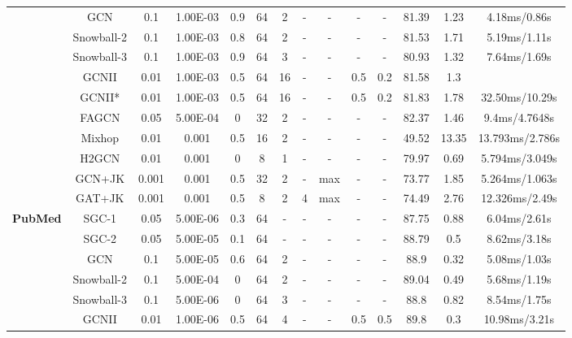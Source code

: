 \documentclass{article}
\newcommand{\0}{{\boldsymbol{0}}}
\newcommand{\6}{{\partial}}
\newcommand{\8}{{\infty}}
\newcommand{\4}{{\nabla}}
\begin{document}
\begin{table}[htbp]
{\begin{tabular}{c|c|cccccccccccc}
          & GCN   & 0.1   & 1.00E-03 & 0.9   & 64    & 2     & -     & -     & -     & -     & 81.39 & 1.23  & 4.18ms/0.86s \\
          & Snowball-2 & 0.1   & 1.00E-03 & 0.8   & 64    & 2     & -     & -     & -     & -     & 81.53 & 1.71  & 5.19ms/1.11s \\
          & Snowball-3 & 0.1   & 1.00E-03 & 0.9   & 64    & 3     & -     & -     & -     & -     & 80.93 & 1.32  & 7.64ms/1.69s \\
          & GCNII & 0.01  & 1.00E-03 & 0.5   & 64    & 16    & -     & -     & 0.5   & 0.2   & 81.58 & 1.3   &  \\
          & GCNII* & 0.01  & 1.00E-03 & 0.5   & 64    & 16    & -     & -     & 0.5   & 0.2   & 81.83 & 1.78  & 32.50ms/10.29s \\
          & FAGCN & 0.05  & 5.00E-04 & 0     & 32    & 2     & -     & -     & -     & -     & 82.37 & 1.46  & 9.4ms/4.7648s \\
          &  Mixhop & 0.01  & 0.001 & 0.5   & 16    & 2     & - & - & - & - & 49.52 & 13.35 & {13.793ms/2.786s} \\
          & H2GCN & 0.01  & 0.001 & 0     & 8     & 1     & - & - & - & - & 79.97 & 0.69  & {5.794ms/3.049s} \\
          & GCN+JK & 0.001 & 0.001 & 0.5   & 32    & 2     & - & {max} & - & - & 73.77 & 1.85  & {5.264ms/1.063s} \\
          &  GAT+JK & 0.001 & 0.001 & 0.5   & 8     & 2     & 4     & {max} & - & - & 74.49 & 2.76  & {12.326ms/2.49s} \\
          \midrule
    \multirow{12}[0]{*}{\textbf{PubMed}} & SGC-1 & 0.05  & 5.00E-06 & 0.3   & 64    & -     & -     & -     & -     & -     & 87.75 & 0.88  & 6.04ms/2.61s \\
          & SGC-2 & 0.05  & 5.00E-05 & 0.1   & 64    & -     & -     & -     & -     & -     & 88.79 & 0.5   & 8.62ms/3.18s \\
          & GCN   & 0.1   & 5.00E-05 & 0.6   & 64    & 2     & -     & -     & -     & -     & 88.9  & 0.32  & 5.08ms/1.03s \\
          & Snowball-2 & 0.1   & 5.00E-04 & 0     & 64    & 2     & -     & -     & -     & -     & 89.04 & 0.49  & 5.68ms/1.19s \\
          & Snowball-3 & 0.1   & 5.00E-06 & 0     & 64    & 3     & -     & -     & -     & -     & 88.8  & 0.82  & 8.54ms/1.75s \\
          & GCNII & 0.01  & 1.00E-06 & 0.5   & 64    & 4     & -     & -     & 0.5   & 0.5   & 89.8  & 0.3   & 10.98ms/3.21s \\

\end{tabular}}
\end{table}
\end{document}
